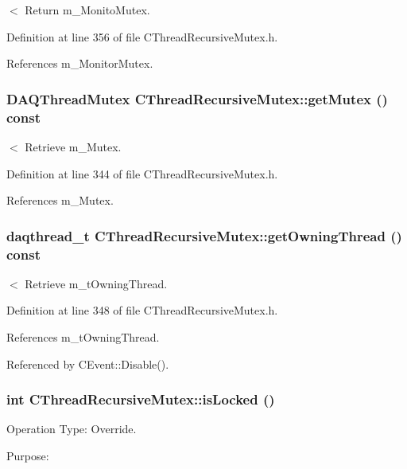 $<$ Return m\_\-Monito\-Mutex.



Definition at line 356 of file CThread\-Recursive\-Mutex.h.

References m\_\-Monitor\-Mutex.
\subsubsection{\setlength{\rightskip}{0pt plus 5cm}DAQThread\-Mutex CThread\-Recursive\-Mutex::get\-Mutex () const\hspace{0.3cm}{\tt  [inline]}}\label{classCThreadRecursiveMutex_a2}


$<$ Retrieve m\_\-Mutex.



Definition at line 344 of file CThread\-Recursive\-Mutex.h.

References m\_\-Mutex.
\subsubsection{\setlength{\rightskip}{0pt plus 5cm}daqthread\_\-t CThread\-Recursive\-Mutex::get\-Owning\-Thread () const\hspace{0.3cm}{\tt  [inline]}}\label{classCThreadRecursiveMutex_a3}


$<$ Retrieve m\_\-t\-Owning\-Thread.



Definition at line 348 of file CThread\-Recursive\-Mutex.h.

References m\_\-t\-Owning\-Thread.

Referenced by CEvent::Disable().
\subsubsection{\setlength{\rightskip}{0pt plus 5cm}int CThread\-Recursive\-Mutex::is\-Locked ()}\label{classCThreadRecursiveMutex_a9}


Operation Type: Override.

Purpose:

